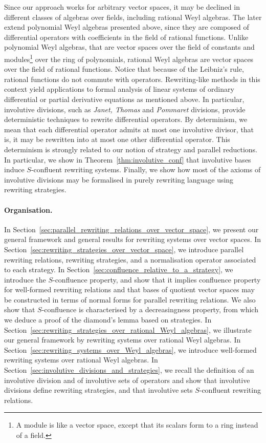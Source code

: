 \documentclass[11pt]{article}
\theoremstyle{definition}
\begin{document}
Since our approach works for arbitrary vector spaces, it may be declined
in different classes of algebras over fields, including rational Weyl
algebras. The later extend polynomial Weyl algebras presented above,
since they are composed of differential operators with coefficients in
the field of rational functions. Unlike polynomial Weyl algebras, that
are vector spaces over the field of constants and modules\footnote{A
  module is like a vector space, except that its scalars form to a ring instead
  of a field.} over the ring of polynomials, rational Weyl algebras are
vector spaces over the field of rational functions. Notice that because
of the Leibniz's rule, rational functions do not commute with operators.
Rewriting-like methods in this context yield applications to formal
analysis of linear systems of ordinary differential or partial derivative
equations as mentioned above. In particular, involutive divisions, such
as {\em Janet, Thomas} and {\em Pommaret} divisions, provide
deterministic techniques to rewrite differential operators. By
determinism, we mean that each differential operator admits at most one
involutive divisor, that is, it may be rewritten into at most one other
differential operator. This determinism is strongly related to our notion
of strategy and parallel reductions. In particular, we show in 
Theorem~\ref{thm:involutive_conf} that involutive bases induce
$S$-confluent rewriting systems. Finally, we show how most of the axioms
of involutive divisions may be formalised in purely rewriting language
using rewriting strategies.
\medskip

\paragraph{Organisation.}

In Section~\ref{sec:parallel_rewriting_relations_over_vector_space}, we
present our general framework and general results for rewriting systems
over vector spaces. In
Section~\ref{sec:rewriting_strategies_over_vector_space}, we introduce
parallel rewriting relations, rewriting strategies, and a normalisation
operator associated to each strategy. In
Section~\ref{sec:confluence_relative_to_a_strategy}, we introduce the
$S$-confluence property, and show that it implies confluence property for
well-formed rewriting relations and that bases of quotient vector spaces
may be constructed in terms of normal forms for parallel rewriting
relations. We also show that $S$-confluence is characterised by a
decreasingness property, from which we deduce a proof of the diamond's
lemma based on strategies. In
Section~\ref{sec:rewriting_strategies_over_rational_Weyl_algebras}, we
illustrate our general framework by rewriting systems over rational 
Weyl algebras. In Section~\ref{sec:rewriting_systems_over_Weyl_algebras},
we introduce well-formed rewriting systems over rational Weyl algebras. 
In Section~\ref{sec:involutive_divisions_and_strategies}, we recall the
definition of an involutive division and of involutive sets of operators
and show that involutive divisions define rewriting strategies, and that
involutive sets $S$-confluent rewriting relations.
\medskip
\end{document}
